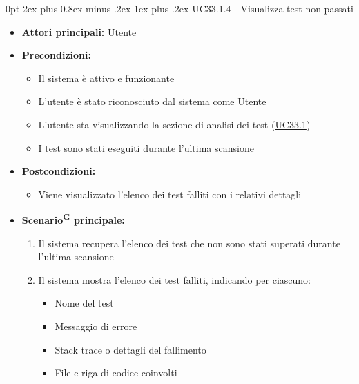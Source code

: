 \documentclass[a4paper, 11pt]{article}
\makeatletter
\renewcommand\subparagraph{\@startsection{subparagraph}{5}
  {0pt}
  {2ex plus 0.8ex minus .2ex}
  {1ex plus .2ex}
  {\normalfont\normalsize\bfseries\color{AccentColor}}}
\makeatother
\begin{document}
\subparagraph{UC33.1.4 - Visualizza test non passati}\label{UC33.1.4}
\begin{itemize}
    \item \textbf{Attori principali:} Utente
    \item \textbf{Precondizioni:}
    \begin{itemize}
        \item Il sistema è attivo e funzionante
        \item L'utente è stato riconosciuto dal sistema come Utente
        \item L'utente sta visualizzando la sezione di analisi dei test (\hyperref[UC33.1]{UC33.1})
        \item I test sono stati eseguiti durante l'ultima scansione
    \end{itemize}
    \item \textbf{Postcondizioni:}
    \begin{itemize}
        \item Viene visualizzato l'elenco dei test falliti con i relativi dettagli
    \end{itemize}
    \item \textbf{Scenario\textsuperscript{G} principale:}
    \begin{enumerate}
        \item Il sistema recupera l'elenco dei test che non sono stati superati durante l'ultima scansione
        \item Il sistema mostra l'elenco dei test falliti, indicando per ciascuno:
        \begin{itemize}
            \item Nome del test
            \item Messaggio di errore
            \item Stack trace o dettagli del fallimento
            \item File e riga di codice coinvolti
        \end{itemize}
    \end{enumerate}

\end{itemize}
\end{document}
